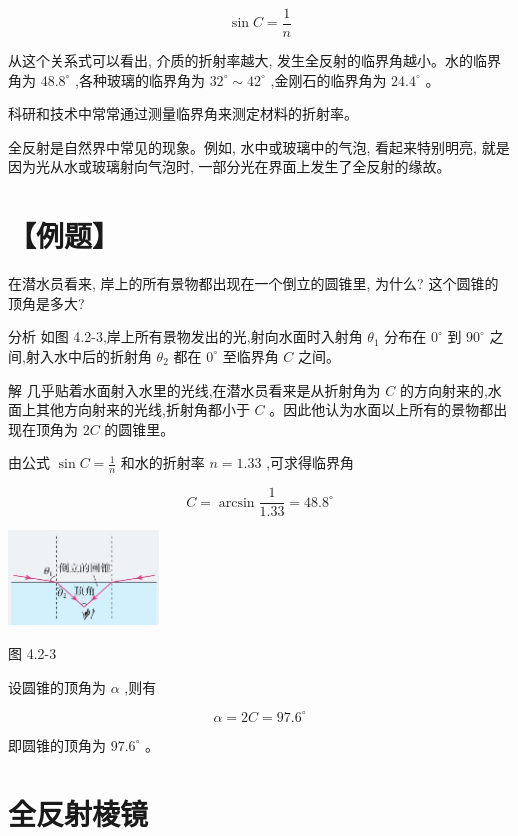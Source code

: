 \documentclass[10pt]{article}
\begin{document}
\[
\sin C = \frac{1}{n}
\]

从这个关系式可以看出, 介质的折射率越大, 发生全反射的临界角越小。水的临界角为 \({48.8}^{ \circ }\) ,各种玻璃的临界角为 \({32}^{ \circ } \sim {42}^{ \circ }\) ,金刚石的临界角为 \({24.4}^{ \circ }\) 。

科研和技术中常常通过测量临界角来测定材料的折射率。

全反射是自然界中常见的现象。例如, 水中或玻璃中的气泡, 看起来特别明亮, 就是因为光从水或玻璃射向气泡时, 一部分光在界面上发生了全反射的缘故。

\section*{【例题】}

在潜水员看来, 岸上的所有景物都出现在一个倒立的圆锥里, 为什么? 这个圆锥的顶角是多大?

分析 如图 4.2-3,岸上所有景物发出的光,射向水面时入射角 \({\theta }_{1}\) 分布在 \({0}^{ \circ }\) 到 \({90}^{ \circ }\) 之间,射入水中后的折射角 \({\theta }_{2}\) 都在 \({0}^{ \circ }\) 至临界角 \(C\) 之间。

解 几乎贴着水面射入水里的光线,在潜水员看来是从折射角为 \(C\) 的方向射来的,水面上其他方向射来的光线,折射角都小于 \(C\) 。因此他认为水面以上所有的景物都出现在顶角为 \({2C}\) 的圆锥里。

由公式 \(\sin C = \frac{1}{n}\) 和水的折射率 \(n = {1.33}\) ,可求得临界角

\[
C = \arcsin \frac{1}{1.33} = {48.8}^{ \circ }
\]

\begin{center}
\includegraphics[max width=0.3\textwidth]{images/01910e4c-ebb8-7d2c-8f2f-2375bc1d2d12_97_706496.jpg}
\end{center}

图 4.2-3

设圆锥的顶角为 \(\alpha\) ,则有

\[
\alpha = {2C} = {97.6}^{ \circ }
\]

即圆锥的顶角为 \({97.6}^{ \circ }\) 。

\section*{全反射棱镜}
\end{document}
